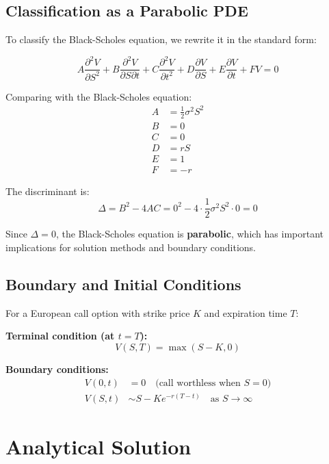 \documentclass[12pt,a4paper]{article}
\numberwithin{algorithm}{subsection}
\begin{document}
\subsection{Classification as a Parabolic PDE}

To classify the Black-Scholes equation, we rewrite it in the standard form:

\begin{equation}
A\frac{\partial^2 V}{\partial S^2} + B\frac{\partial^2 V}{\partial S \partial t} + C\frac{\partial^2 V}{\partial t^2} + D\frac{\partial V}{\partial S} + E\frac{\partial V}{\partial t} + FV = 0
\end{equation}

Comparing with the Black-Scholes equation:
\begin{align}
A &= \frac{1}{2}\sigma^2 S^2 \\
B &= 0 \\
C &= 0 \\
D &= rS \\
E &= 1 \\
F &= -r
\end{align}

The discriminant is:
\begin{equation}
\Delta = B^2 - 4AC = 0^2 - 4 \cdot \frac{1}{2}\sigma^2 S^2 \cdot 0 = 0
\end{equation}

Since $\Delta = 0$, the Black-Scholes equation is \textbf{parabolic}, which has important implications for solution methods and boundary conditions.

\subsection{Boundary and Initial Conditions}

For a European call option with strike price $K$ and expiration time $T$:

\textbf{Terminal condition (at $t = T$):}
\begin{equation}
V(S, T) = \max(S - K, 0)
\end{equation}

\textbf{Boundary conditions:}
\begin{align}
V(0, t) &= 0 \quad \text{(call worthless when $S = 0$)} \\
V(S, t) &\sim S - Ke^{-r(T-t)} \quad \text{as } S \to \infty
\end{align}

\section{Analytical Solution}
\label{sec:analytical-solution}
\end{document}

